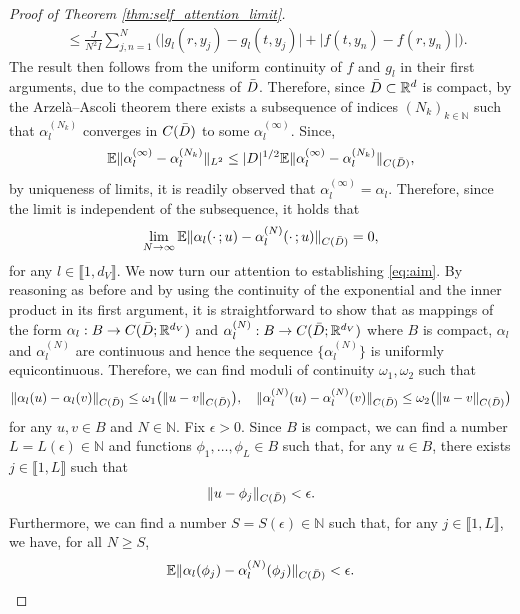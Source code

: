 \documentclass[twoside]{article}
\newcommand{\1}{\mathbbm{1}}
\newcommand{\R}{\mathbbm{R}}
\newcommand{\N}{\mathbbm{N}}
\newcommand{\range}[2]{\llbracket #1, #2 \rrbracket}
\providecommand{\mathbbm}{\mathbb} %
\newcommand{\E}{\mathbb{E}}
\begin{document}
\begin{proof}[Proof of Theorem \ref{thm:self_attention_limit}]
\begin{subequations}
\begin{align}
            &\leq \frac{J}{N^2I}\sum_{j,n=1}^N\bigl(\bigl|g_l(r,y_j)-g_l(t,y_j) \bigr|+\bigl|f(t,y_n)-f(r,y_n)\bigr| \bigr).
        \end{align}
    \end{subequations}
    The result then follows from the uniform continuity of $f$ and $g_l$ in their first arguments, due to the compactness of $\Bar{D}$.
Therefore, since $\Bar{D}\subset\R^d$ is compact, by the Arzel\`a–Ascoli theorem there exists a subsequence of indices $(N_k)_{k\in\N}$ such that $\alpha_l^{(N_k)}$ converges in $C(\Bar{D})$ to some $\alpha_l^{(\infty)}$. Since,
\begin{equation*}
   \E \|\alpha_l^{(\infty)} - \alpha_l^{(N_k)}\|_{L^2} \leq |D|^{1/2}\E \|\alpha_l^{(\infty)} - \alpha_l^{(N_k)}\|_{C(\Bar{D})},
\end{equation*}
by uniqueness of limits, it is readily observed that $\alpha_l^{(\infty)}=\alpha_l$. Therefore, since the limit is independent of the subsequence, it holds that
\[\lim_{N \to \infty} \E \|\alpha_l(\cdot\,;u) - \alpha_l^{(N)}(\cdot\,;u)\|_{C(\Bar{D})} = 0,\]
for any $l\in\range{1}{d_V}$. We now turn our attention to establishing \eqref{eq:aim}. By reasoning as before and by using the continuity of the exponential and the inner product in its first argument, it is straightforward to show that as mappings of the form \(\alpha_l:B \to C(\Bar{D};\R^{d_V})\) and \(\alpha_l^{(N)}:B \to C(\Bar{D};\R^{d_V})\) where $B$ is compact, \(\alpha_l\) and \(\alpha_l^{(N)}\) are continuous and hence the sequence \( \{\alpha_l^{(N)}\}\) is uniformly equicontinuous. Therefore, we can find moduli of continuity $\omega_1, \omega_2$ such that
\[\|\alpha_l(u) - \alpha_l(v)\|_{C(\Bar{D})} \leq \omega_1 \big ( \|u - v\|_{C(\Bar{D})} \big ), \quad \|\alpha_l^{(N)}(u) - \alpha_l^{(N)}(v)\|_{C(\Bar{D})} \leq \omega_2 \big ( \|u - v\|_{C(\Bar{D})} \big )\]
for any $u,v \in B$ and $N \in \mathbb{N}$. Fix $\epsilon > 0$. Since $B$ is compact, we can find a number $L = L (\epsilon) \in \mathbb{N}$ and functions $\phi_1, \dots, \phi_L \in B$ such that, for any $u \in B$, there exists $j \in \range{1}{L}$ such that
\[\|u - \phi_j\|_{C(\Bar{D})} < \epsilon.\]
Furthermore, we can find a number $S = S(\epsilon) \in \mathbb{N}$ such that, for any $j \in \range{1}{L}$, we have, for all $N \geq S$,
\[\E \|\alpha_l(\phi_j) - \alpha_l^{(N)} (\phi_j)\|_{C(\Bar{D})} < \epsilon.\]

\end{proof}
\end{document}
